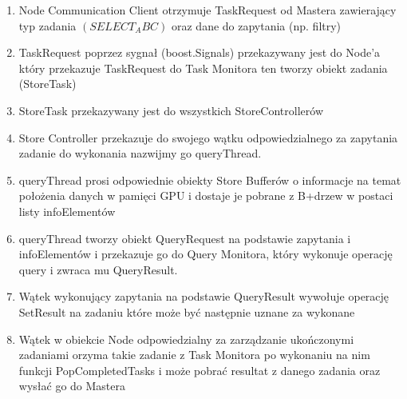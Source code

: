 \documentclass[paper=a4, fontsize=11pt]{scrartcl} %
\numberwithin{equation}{section} %
\numberwithin{figure}{section} %
\numberwithin{table}{section} %
\begin{document}
		\begin{enumerate}
			\item Node Communication Client otrzymuje TaskRequest od Mastera zawierający typ zadania $(SELECT_ABC)$ oraz dane do zapytania (np. filtry)
			\item TaskRequest poprzez sygnał (boost.Signals) przekazywany jest do Node'a który przekazuje TaskRequest do Task Monitora ten tworzy 
				obiekt zadania (StoreTask)
			\item StoreTask przekazywany jest do wszystkich StoreControllerów
			\item Store Controller przekazuje do swojego wątku odpowiedzialnego za zapytania zadanie do wykonania nazwijmy go queryThread. 
			\item queryThread prosi odpowiednie obiekty Store Bufferów o informacje na temat położenia danych w pamięci GPU i dostaje je pobrane z B+drzew w postaci listy infoElementów
			\item queryThread tworzy obiekt QueryRequest na podstawie zapytania i infoElementów i przekazuje go do Query Monitora, który wykonuje operację query i zwraca mu QueryResult. 
			\item Wątek wykonujący zapytania na podstawie QueryResult wywołuje operację SetResult na zadaniu które może być następnie uznane za wykonane
			\item Wątek w obiekcie Node odpowiedzialny za zarządzanie ukończonymi zadaniami orzyma takie zadanie z Task Monitora po wykonaniu na nim funkcji PopCompletedTasks
				i może pobrać resultat z danego zadania oraz wysłać go do Mastera 
		\end{enumerate}
\end{document}
